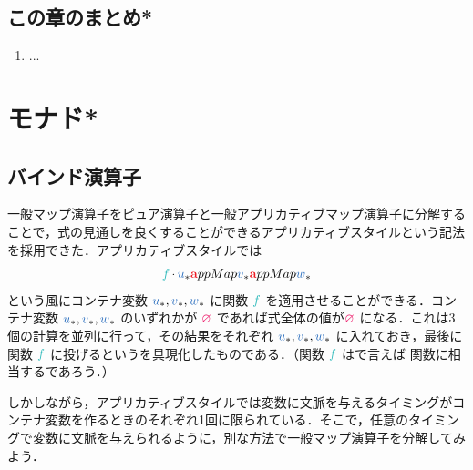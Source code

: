 \documentclass[a5paper,twoside,fleqn,draft]{jsbook}
\begin{document}
\section{この章のまとめ*}

\begin{enumerate}
\item ...
\end{enumerate}

\chapter{モナド*}
\label{ch:monad}

\section{バインド演算子}

一般マップ演算子をピュア演算子と一般アプリカティブマップ演算子に分解することで，式の見通しを良くすることができるアプリカティブスタイルという記法を採用できた．アプリカティブスタイルでは
\begin{equation}
  \hFunc{f}\mMap\mVarContainer{u}\hTypeName{a}ppMap\mVarContainer{v}\hTypeName{a}ppMap\mVarContainer{w}
\end{equation}
という風にコンテナ変数 $\mVarContainer{u},\mVarContainer{v},\mVarContainer{w}$ に関数 $\hFunc{f}$ を適用させることができる．コンテナ変数 $\mVarContainer{u},\mVarContainer{v},\mVarContainer{w}$ のいずれかが $\mPureNothing$ であれば式全体の値が$\mPureNothing$ になる．これは3個の計算を並列に行って，その結果をそれぞれ $\mVarContainer{u},\mVarContainer{v},\mVarContainer{w}$ に入れておき，最後に関数 $\hFunc{f}$ に投げるというを具現化したものである．（関数 $\hFunc{f}$ は\clang で言えば  関数に相当するであろう．）

しかしながら，アプリカティブスタイルでは変数に文脈を与えるタイミングがコンテナ変数を作るときのそれぞれ1回に限られている．そこで，任意のタイミングで変数に文脈を与えられるように，別な方法で一般マップ演算子を分解してみよう．
\end{document}
